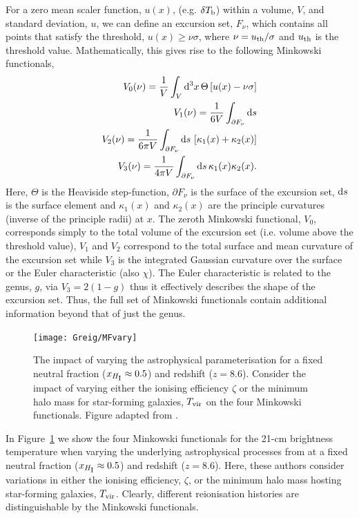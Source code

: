 For a zero mean scaler function, $u(x)$, (e.g. $\delta T_{\rm b}$) within a volume, $V$, and standard deviation, $u$, we can define an excursion set, $F_{\nu}$, which contains all points that satisfy the threshold, $u(x) \geq \nu\sigma$, where $\nu = u_{\rm th}/\sigma$ and $u_{\rm th}$ is the threshold value. Mathematically, this gives rise to the following Minkowski functionals,
\begin{eqnarray}
V_{0}(\nu) = \frac{1}{V}\int_{V} {\rm d^3}x\,\Theta\left[u(x) - \nu \sigma\right] \\
V_{1}(\nu) = \frac{1}{6V}\int_{\partial F_{\nu}} {\rm d}s \\
V_{2}(\nu) = \frac{1}{6\pi V}\int_{\partial F_{\nu}} {\rm d}s\,\left[\kappa_{1}(x) + \kappa_{2}(x)\right] \\
V_{3}(\nu) = \frac{1}{4\pi V}\int_{\partial F_{\nu}} {\rm d}s\, \kappa_{1}(x)\kappa_{2}(x).
\end{eqnarray}
Here, $\Theta$ is the Heaviside step-function, $\partial F_{\nu}$ is the surface of the excursion set, ${\rm d}s$ is the surface element and $\kappa_{1}(x)$ and  $\kappa_{2}(x)$ are the principle curvatures (inverse of the principle radii) at $x$. The zeroth Minkowski functional, $V_{0}$, corresponds simply to the total volume of the excursion set (i.e. volume above the threshold value), $V_{1}$ and $V_{2}$ correspond to the total surface and mean curvature of the excursion set while $V_{3}$ is the integrated Gaussian curvature over the surface or the Euler characteristic (also $\chi$). The Euler characteristic is related to the genus, $g$, via $V_{3} = 2(1-g)$ thus it effectively describes the shape of the excursion set. Thus, the full set of Minkowski functionals contain additional information beyond that of just the genus.

\begin{figure}[]
\begin{center}
\texttt{[image: Greig/MFvary]}
\end{center}
\caption{The impact of varying the astrophysical parameterisation for a fixed neutral fraction ($x_{H_{\rm \scriptstyle I}}\approx 0.5$) and redshift ($z=8.6$). Consider the impact of varying either the ionising efficiency $\zeta$ or the minimum halo mass for star-forming galaxies, $T_{\rm vir}$ on the four Minkowski functionals. Figure adapted from \cite{Yoshiura:2017}.}
\label{fig:MFs}
\end{figure}

In Figure~\ref{fig:MFs} we show the four Minkowski functionals for the 21-cm brightness temperature when varying the underlying astrophysical processes from \cite{Yoshiura:2017} at a fixed neutral fraction ($x_{H_{\rm \scriptstyle I}}\approx 0.5$) and redshift ($z=8.6$). Here, these authors consider variations in either the ionising efficiency, $\zeta$, or the minimum halo mass hosting star-forming galaxies, $T_{\rm vir}$. Clearly, different reionisation histories are distinguishable by the Minkowski functionals.

